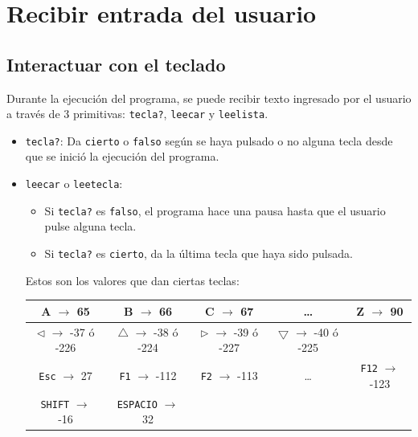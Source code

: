 \chapter{Recibir entrada del usuario}
   \label{Interaccion-Usuario}

\section{Interactuar con el teclado}
   \label{Interactuar-Teclado}

Durante la ejecuci\'on del programa, se puede recibir texto ingresado
por el usuario a trav\'es de 3 primitivas:
\texttt{tecla?}, 
\texttt{leecar}  y
\texttt{leelista}. 
\begin{itemize}
   \item \texttt{tecla?}: Da \texttt{cierto} o \texttt{falso} seg\'un se haya
      pulsado o no alguna tecla desde que se inici\'o la ejecuci\'on del
      programa. 
   \item \texttt{leecar} o \texttt{leetecla}:
      \begin{itemize}
         \item Si \texttt{tecla?} es \texttt{falso}, el programa hace una
            pausa hasta que el usuario pulse alguna tecla.
         \item Si \texttt{tecla?} es \texttt{cierto}, da la \'ultima tecla
            que haya sido pulsada.
      \end{itemize}
      Estos son los valores que dan ciertas teclas:
      \begin{center}\begin{tabular}{|c|c|c|c|c|} \hline 
         A  $\rightarrow$  65 & B  $\rightarrow$  66 & C  $\rightarrow$  67 & \ldots
            & Z  $\rightarrow$  90 \\ \hline
         $\triangleleft$ $\rightarrow$ -37 \'o -226 &
           $\bigtriangleup$ $\rightarrow$ -38 \'o -224 &
              $\triangleright$ $\rightarrow$ -39 \'o -227 &
                 $\bigtriangledown$ $\rightarrow$ -40 \'o -225 & \\ \hline 
         \texttt{Esc} $\rightarrow$  27 & \texttt{F1}  $\rightarrow$  -112 &
           \texttt{F2}  $\rightarrow$  -113 & \ldots &
             \texttt{F12}  $\rightarrow$  -123 \\ \hline
         \texttt{SHIFT}  $\rightarrow$  -16 & \texttt{ESPACIO}  $\rightarrow$  32 &

\end{tabular}
\end{center}
\end{itemize}
